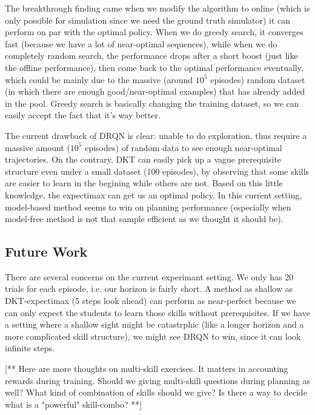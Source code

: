 The breakthrough finding came when we modify the algorithm to online (which is only possible for simulation since we need the ground truth simulator) it can perform on par with the optimal policy. When we do greedy search, it converges fast (because we have a lot of near-optimal sequences), while when we do completely random search, the performance drops after a short boost (just like the offline performance), then come back to the optimal performance eventually, which could be mainly due to the massive (around $10^5$ episodes) random dataset (in which there are enough good/near-optimal examples) that has already added in the pool. Greedy search is basically changing the training dataset, so we can easily accept the fact that it’s way better.

The current drawback of DRQN is clear: unable to do exploration, thus require a massive amount ($10^5$ episodes) of random data to see enough near-optimal trajectories. On the contrary, DKT can easily pick up a vague prerequisite structure even under a small dataset (100 episodes), by observing that some skills are easier to learn in the begining while others are not. Based on this little knowledge, the expectimax can get us an optimal policy. In this current setting, model-based method seems to win on planning performance (especially when model-free method is not that sample efficient as we thought it should be).

\subsection{Future Work}

There are several concerns on the current experimant setting. We only has 20 trials for each episode, i.e. our horizon is fairly short. A method as shallow as DKT-expectimax (5 steps look ahead) can perform as near-perfect because we can only expect the students to learn those skills without prerequisites. If we have a setting where a shallow sight might be catastrphic (like a 
longer horizon and a more complicated skill structure), we might see DRQN to win, since it can look infinite steps.

[** Here are more thoughts on multi-skill exercises. It matters in accounting rewards during training. Should we giving multi-skill questions during planning as well? What kind of combination of skills should we give? Is there a way to decide what is a "powerful" skill-combo? **]

